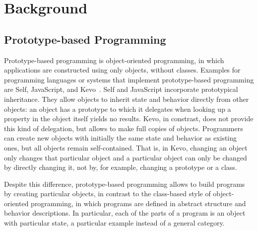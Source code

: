 \chapter{Background} \label{chapter:BACKGROUND}



\section{Prototype-based Programming}

Prototype-based programming is object-oriented programming, in which applications are constructed using only objects, without classes.
Examples for programming languages or systems that implement prototype-based programming are Self, JavaScript, and Kevo~\cite{Taivalsaari1992Kevo}.
Self and JavaScript incorporate prototypical inheritance.
They allow objects to inherit state and behavior directly from other objects: an object has a prototype to which it delegates when looking up a property in the object itself yields no results.
Kevo, in constrast, does not provide this kind of delegation, but allows to make full copies of objects.
Programmers can create new objects with initially the same state and behavior as existing ones, but all objects remain self-contained.
That is, in Kevo, changing an object only changes that particular object and a particular object can only be changed by directly changing it, not by, for example, changing a prototype or a class.

Despite this difference, prototype-based programming allows to build programs by creating particular objects, in contrast to the class-based style of object-oriented programming, in which programs are defined in abstract structure and behavior descriptions.
In particular, each of the parts of a program is an object with particular state, a particular example instead of a general category.

